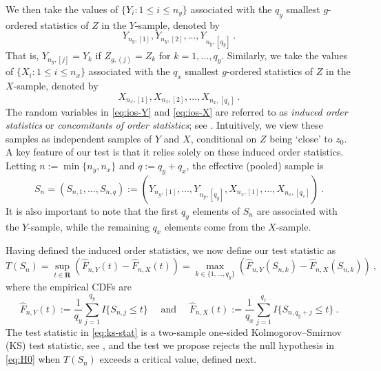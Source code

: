 \documentclass[11pt]{article}
\numberwithin{equation}{section}
\begin{document}
We then take the values of $\{Y_i:1\le i\le n_y\}$ associated with the $q_y$ smallest $g$-ordered statistics of $Z$ in the $Y$-sample, denoted by 
\begin{equation}\label{eq:ios-Y}
  Y_{n_y,[1]},Y_{n_y,[2]}, \dots,Y_{n_y,[q_y]}~.
\end{equation}
That is, $Y_{n_y,[j]}=Y_k$ if $Z_{g,(j)}=Z_k$ for $k=1,\dots,q_y$. Similarly, we take the values of $\{X_i:1\le i\le n_x\}$ associated with the $q_x$ smallest $g$-ordered statistics of $Z$ in the $X$-sample, denoted by  
\begin{equation}\label{eq:ios-X}
  X_{n_x,[1]},X_{n_x,[2]}, \dots,X_{n_x,[q_x]}~.
\end{equation}
The random variables in \eqref{eq:ios-Y} and \eqref{eq:ios-X} are referred to as \emph{induced order statistics} or \emph{concomitants of order statistics}; see \cite{david/galambos:74,bhattacharya:74,canay/kamat:18}. Intuitively, we view these samples as independent samples of \(Y\) and \(X\), conditional on \(Z\) being `close' to \(z_{0}\). A key feature of our test is that it relies solely on these induced order statistics. Letting \(n := \min\{n_y,n_x\}\) and \(q := q_y + q_x\), the effective (pooled) sample is
\begin{equation}\label{eq:Sn}
  S_n = (S_{n,1}, \dots, S_{n,q}) := (Y_{n_y,[1]}, \dots, Y_{n_y,[q_y]}, X_{n_x,[1]}, \dots, X_{n_x,[q_x]})~.
\end{equation}
It is also important to note that the first \(q_y\) elements of \(S_n\) are associated with the \(Y\)-sample, while the remaining \(q_x\) elements come from the \(X\)-sample.

Having defined the induced order statistics, we now define our test statistic as 
\begin{equation}\label{eq:ks-stat}
  T(S_n) = \sup_{t\in \mathbf R} \left( \hat F_{n,Y}(t) - \hat F_{n,X}(t) \right) = \max_{k \in \{1,\dots,q_y\}} \left( \hat F_{n,Y}(S_{n,k}) - \hat F_{n,X}(S_{n,k}) \right) ~,
\end{equation}
where the empirical CDFs are 
\begin{equation*}
  \hat F_{n,Y}(t) := \frac{1}{q_y} \sum_{j=1}^{q_y} I\{S_{n,j} \le t\} \quad \text{ and }\quad \hat F_{n,X}(t) := \frac{1}{q_x} \sum_{j=1}^{q_x} I\{S_{n,q_y+j} \le t\}~.
\end{equation*}
The test statistic in \eqref{eq:ks-stat} is a two-sample one-sided Kolmogorov--Smirnov (KS) test statistic, see \citet[][p.\ 99]{hajek/sidak/sen:99}, and the test we propose rejects the null hypothesis in \eqref{eq:H0} when $T(S_n)$ exceeds a critical value, defined next.
\end{document}
